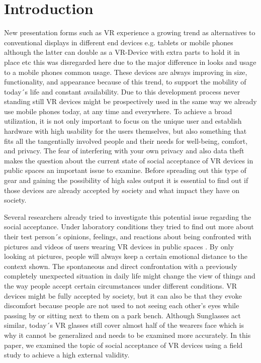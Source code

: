 \documentclass[sigchi]{acmart}
\begin{document}
\section{Introduction}
New presentation forms such as VR experience a growing trend as alternatives to conventional displays in different end devices e.g. tablets or mobile phones although the latter can double as a VR-Device with extra parts to hold it in place etc this was disregarded here due to the major difference in looks and usage to a mobile phones common usage. These devices are always improving in size, functionality, and appearance because of this trend, to support the mobility of today´s life and constant availability. Due to this development process never standing still VR devices might be prospectively used in the same way we already use mobile phones today, at any time and everywhere. To achieve a broad utilization, it is not only important to focus on the unique user and establish hardware with high usability for the users themselves, but also something that fits all the tangentially involved people and their needs for well-being, comfort, and privacy. The fear of interfering with your own privacy and also data theft makes the question about the current state of social acceptance of VR devices in public spaces an important issue to examine. Before spreading out this type of gear and gaining the possibility of high sales output it is essential to find out if those devices are already accepted by society and what impact they have on society.

Several researchers already tried to investigate this potential issue regarding the social acceptance. Under laboratory conditions they tried to find out more about their test person´s opinions, feelings, and reactions about being confronted with pictures and videos of users wearing VR devices in public spaces \cite{schwind2018virtual}. By only looking at pictures, people will always keep a certain emotional distance to the context shown. The spontaneous and direct confrontation with a previously completely unexpected situation in daily life might change the view of things and the way people accept certain circumstances under different conditions. VR devices might be fully accepted by society, but it can also be that they evoke discomfort because people are not used to not seeing each other's eyes while passing by or sitting next to them on a park bench. Although Sunglasses act similar, today´s VR glasses still cover almost half of the wearers face which is why it cannot be generalized and needs to be examined more accurately. 
In this paper, we examined the topic of social acceptance of VR devices using a field study to achieve a high external validity.
\end{document}
